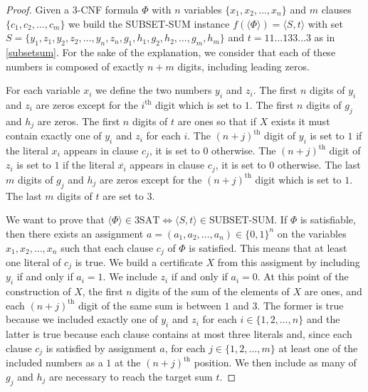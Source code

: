 \documentclass{article}
\newcommand{\nth}[1]{#1^{\text{th}}}
\begin{document}
\begin{proof}
	Given a 3-CNF formula \(\Phi\) with \(n\) variables
	\(\{x_1,x_2,\ldots,x_n\}\) and \(m\) clauses \(\{c_1,c_2,\ldots,c_m\}\)
	we build the SUBSET-SUM instance \(f(\langle \Phi \rangle) = \langle
	S,t\rangle\) with set \(S =
	\{y_1,z_1,y_2,z_2,\ldots,y_n,z_n,g_1,h_1,g_2,h_2,\ldots,g_m,h_m\}\) and
	\(t = 11\ldots133\ldots3\) as in
	\ref{subsetsum}. For the sake of the explanation, we consider that each of
	these numbers is composed of exactly \(n+m\) digits, including leading
	zeros.

	For each variable \(x_i\) we define the two numbers
	\(y_i\) and \(z_i\). The first \(n\) digits of \(y_i\) and \(z_i\) are
	zeros except for the \(\nth{i}\) digit which is set to \(1\). The first
	\(n\) digits of \(g_j\) and \(h_j\) are zeros. The first
	\(n\) digits of \(t\) are ones so that if \(X\) exists it must contain
	exactly one of \(y_i\) and \(z_i\) for each \(i\).
	The \(\nth{(n+j)}\) digit of \(y_i\) is set to \(1\) if the literal \(x_i\)
	appears in clause \(c_j\), it is set to \(0\) otherwise.
	The \(\nth{(n+j)}\) digit of \(z_i\) is set to \(1\) if the literal
	\(\overline{x_i}\)
	appears in clause \(c_j\), it is set to \(0\) otherwise. The last \(m\)
	digits of \(g_j\) and \(h_j\) are zeros except for the \(\nth{(n+j)}\) digit
	which is set to \(1\). The last \(m\) digits of \(t\) are set to \(3\).

	We want to prove that \(\langle \Phi \rangle \in \text{3SAT} \iff \langle
	S,t\rangle \in \text{SUBSET-SUM}\).
	If \(\Phi\) is satisfiable, then there
	exists an assignment \(a = (a_1, a_2,\ldots,a_n) \in \{0,1\}^n\) on the
	variables \(x_1,x_2,\ldots,x_n\) such that each clause \(c_j\) of \(\Phi\)
	is satisfied. This means that at least one literal of \(c_j\) is true. We
	build a certificate \(X\) from this assigment by including \(y_i\) if and
	only if \(a_i = 1\). We include \(z_i\) if and only if \(a_i = 0\).
	At this point of the construction of \(X\), the first \(n\) digits of the
	sum of the elements of \(X\) are ones, and each \(\nth{(n+j)}\) digit of
	the same sum is between \(1\) and \(3\). The former is true because we
	included exactly one of \(y_i\) and \(z_i\) for each \(i \in
	\{1,2,\ldots,n\}\) and the latter is true because each clause contains at
	most three literals and, since each clause \(c_j\) is satisfied by
	assignment \(a\), for each \(j \in \{1,2,\ldots,m\}\) at least one of the
	included numbers as a \(1\) at the \(\nth{(n+j)}\) position.
	We then include as many of \(g_j\) and \(h_j\) are necessary to reach the
	target sum \(t\).


\end{proof}
\end{document}
